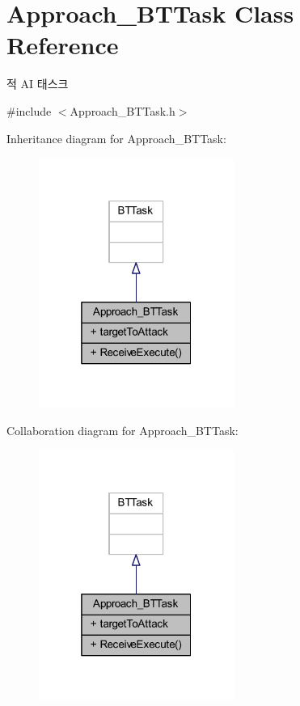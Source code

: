 \hypertarget{class_approach___b_t_task}{}\section{Approach\+\_\+\+B\+T\+Task Class Reference}
\label{class_approach___b_t_task}


적 AI 태스크  




{\ttfamily \#include $<$Approach\+\_\+\+B\+T\+Task.\+h$>$}



Inheritance diagram for Approach\+\_\+\+B\+T\+Task\+:\nopagebreak
\begin{figure}[H]
\begin{center}
\leavevmode
\includegraphics[width=181pt]{class_approach___b_t_task__inherit__graph}
\end{center}
\end{figure}


Collaboration diagram for Approach\+\_\+\+B\+T\+Task\+:\nopagebreak
\begin{figure}[H]
\begin{center}
\leavevmode
\includegraphics[width=181pt]{class_approach___b_t_task__coll__graph}
\end{center}
\end{figure}

